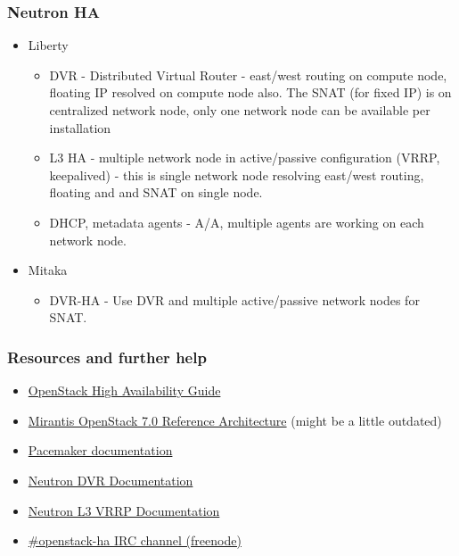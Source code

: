 \documentclass[aspectratio=169]{beamer}
\begin{document}
\begin{frame}
    \frametitle{Neutron HA}
    \begin{itemize}
        \item Liberty
        \begin{itemize}
	        \item DVR - Distributed Virtual Router - east/west routing on compute node, floating IP resolved on compute node also. The SNAT (for fixed IP) is on centralized network node, only one network node can be available per installation
	        \item L3 HA - multiple network node in active/passive configuration (VRRP, keepalived) - this is single network node resolving east/west routing, floating and and SNAT on single node.
	        \item DHCP, metadata agents - A/A, multiple agents are working on each network node.
	    \end{itemize}
        \item Mitaka
        \begin{itemize}
            \item DVR-HA - Use DVR and multiple active/passive network nodes for SNAT.
        \end{itemize}
    \end{itemize}
\end{frame}

\begin{frame}
    \frametitle{Resources and further help}
    \begin{itemize}
        \item \href{http://docs.openstack.org/ha-guide/}{OpenStack High Availability Guide}
        \item \href{https://docs.mirantis.com/openstack/fuel/fuel-7.0/reference-architecture.html}{Mirantis OpenStack 7.0 Reference Architecture} (might be a little outdated)
        \item \href{http://clusterlabs.org/}{Pacemaker documentation}
        \item \href{http://docs.openstack.org/mitaka/networking-guide/scenario-dvr-ovs.html}{Neutron DVR Documentation}
        \item \href{http://docs.openstack.org/mitaka/networking-guide/scenario-l3ha-ovs.html}{Neutron L3 VRRP Documentation}
        \item \href{irc://chat.freenode.net/openstack-ha}{\#openstack-ha IRC channel (freenode)}
    \end{itemize}
\end{frame}
\end{document}
